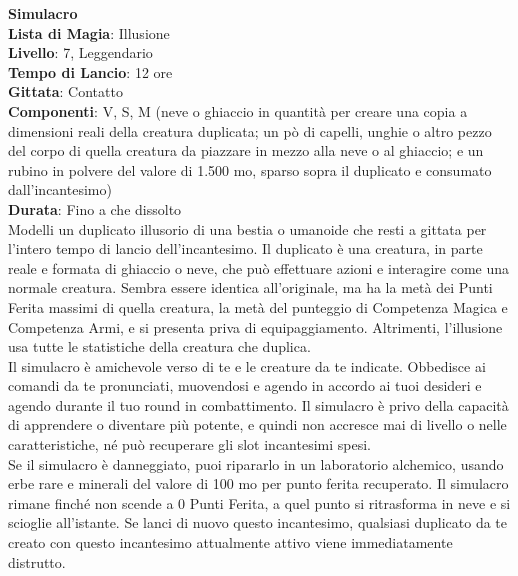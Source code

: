 \documentclass[a4paper,twoside,openany]{book}
\begin{document}
\begin{multicols}{2}
\medskip\textbf{Simulacro}\\
\textbf{Lista di Magia}: Illusione\\
\textbf{Livello}: 7, Leggendario\\
\textbf{Tempo di Lancio}: 12 ore\\
\textbf{Gittata}: Contatto\\
\textbf{Componenti}: V, S, M (neve o ghiaccio in quantità per creare una copia a dimensioni reali della creatura duplicata; un pò di capelli, unghie o altro pezzo del corpo di quella creatura da piazzare in mezzo alla neve o al ghiaccio; e un rubino in polvere del valore di 1.500 mo, sparso sopra il duplicato e consumato dall'incantesimo)\\
\textbf{Durata}: Fino a che dissolto\\
Modelli un duplicato illusorio di una bestia o umanoide che resti a gittata per l'intero tempo di lancio dell'incantesimo. Il duplicato è una creatura, in parte reale e formata di ghiaccio o neve, che può effettuare azioni e interagire come una normale creatura. Sembra essere identica all'originale, ma ha la metà dei Punti Ferita massimi di quella creatura, la metà del punteggio di Competenza Magica e Competenza Armi, e si presenta priva di equipaggiamento. Altrimenti, l'illusione usa tutte le statistiche della creatura che duplica.\\
Il simulacro è amichevole verso di te e le creature da te indicate. Obbedisce ai comandi da te pronunciati, muovendosi e agendo in accordo ai tuoi desideri e agendo durante il tuo round in combattimento. Il simulacro è privo della capacità di apprendere o diventare più potente, e quindi non accresce mai di livello o nelle caratteristiche, né può recuperare gli slot incantesimi spesi.\\
Se il simulacro è danneggiato, puoi ripararlo in un laboratorio alchemico, usando erbe rare e minerali del valore di 100 mo per punto ferita recuperato. Il simulacro rimane finché non scende a 0 Punti Ferita, a quel punto si ritrasforma in neve e si scioglie all'istante. Se lanci di nuovo questo incantesimo, qualsiasi duplicato da te creato con questo incantesimo attualmente attivo viene immediatamente distrutto.


\end{multicols}
\end{document}

